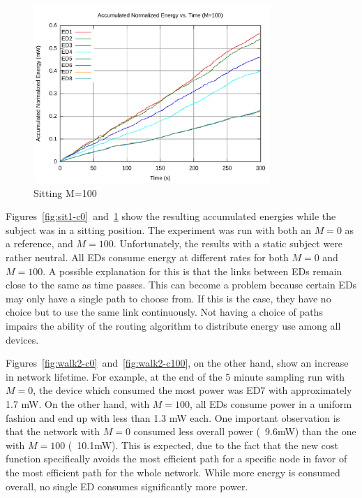 \documentclass{article}
\begin{document}
\begin{figure}[!ht]
\includegraphics[width=0.8\textwidth]{figures/sit1-c100.pdf}
\caption{Sitting M=100}
\label{fig:sit1-c100}
\end{figure}

Figures~\ref{fig:sit1-c0}~and~\ref{fig:sit1-c100} show the resulting accumulated energies while the subject was in a sitting position. The experiment was run with both an $M=0$ as a reference, and $M=100$. Unfortunately, the results with a static subject were rather neutral. All EDs consume energy at different rates for both $M=0$ and $M=100$. A possible explanation for this is that the links between EDs remain close to the same as time passes. This can become a problem because certain EDs may only have a single path to choose from. If this is the case, they have no choice but to use the same link continuously. Not having a choice of paths impairs the ability of the routing algorithm to distribute energy use among all devices.

Figures~\ref{fig:walk2-c0}~and~\ref{fig:walk2-c100}, on the other hand, show an increase in network lifetime. For example, at the end of the 5 minute sampling run with $M=0$, the device which consumed the most power was ED7 with approximately 1.7 mW. On the other hand, with $M=100$, all EDs consume power in a uniform fashion and end up with less than 1.3 mW each. One important observation is that the network with $M=0$ consumed less overall power (~9.6mW) than the one with $M=100$ (~10.1mW). This is expected, due to the fact that the new cost function specifically avoids the most efficient path for a specific node in favor of the most efficient path for the whole network. While more energy is consumed overall, no single ED consumes significantly more power. 
\end{document}
